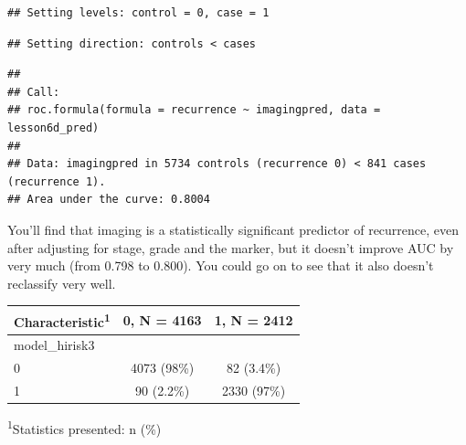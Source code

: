 \documentclass[]{book}
\newenvironment{Shaded}{\begin{snugshade}}{\end{snugshade}}
\newcommand{\DataTypeTok}[1]{\textcolor[rgb]{0.13,0.29,0.53}{#1}}
\newcommand{\DecValTok}[1]{\textcolor[rgb]{0.00,0.00,0.81}{#1}}
\newcommand{\FloatTok}[1]{\textcolor[rgb]{0.00,0.00,0.81}{#1}}
\newcommand{\KeywordTok}[1]{\textcolor[rgb]{0.13,0.29,0.53}{\textbf{#1}}}
\newcommand{\NormalTok}[1]{#1}
\newcommand{\OperatorTok}[1]{\textcolor[rgb]{0.81,0.36,0.00}{\textbf{#1}}}
\newcommand{\StringTok}[1]{\textcolor[rgb]{0.31,0.60,0.02}{#1}}
\begin{document}
\begin{verbatim}
## Setting levels: control = 0, case = 1
\end{verbatim}

\begin{verbatim}
## Setting direction: controls < cases
\end{verbatim}

\begin{verbatim}
## 
## Call:
## roc.formula(formula = recurrence ~ imagingpred, data = lesson6d_pred)
## 
## Data: imagingpred in 5734 controls (recurrence 0) < 841 cases (recurrence 1).
## Area under the curve: 0.8004
\end{verbatim}

You'll find that imaging is a statistically significant predictor of recurrence, even after adjusting for stage, grade and the marker, but it doesn't improve AUC by very much (from 0.798 to 0.800). You could go on to see that it also doesn't reclassify very well.

\begin{Shaded}
\end{Shaded}

\captionsetup[table]{labelformat=empty,skip=1pt}
\begin{longtable}{lcc}
\toprule
\textbf{Characteristic}\textsuperscript{1} & \textbf{0}, N = 4163 & \textbf{1}, N = 2412 \\ 
\midrule
model\_hirisk3 &  &  \\ 
0 & 4073 (98\%) & 82 (3.4\%) \\ 
1 & 90 (2.2\%) & 2330 (97\%) \\ 
\bottomrule
\end{longtable}
\vspace{-5mm}
\begin{minipage}{\linewidth}
\textsuperscript{1}Statistics presented: n (\%) \\ 
\end{minipage}
\end{document}
